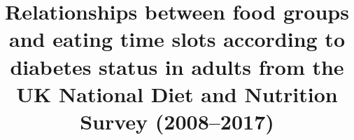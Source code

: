 \documentclass{bmcart}
\begin{document}
\begin{frontmatter}

\begin{fmbox}


\title{Relationships between food groups and eating time slots according to diabetes status in
  adults from the UK National Diet and Nutrition Survey (2008--2017)}


\author[
  addressref={aff1},                   %
  email={chaochen@wangcc.me}   %
]{ }
\author[
  addressref={aff2},
  email={}
]{ }
\author[
  addressref={aff3, aff4, aff5},
  corref={aff3},
  email={Luigi.Palla@uniroma1.it}
]{ }



\end{fmbox}
\end{frontmatter}
\end{document}
